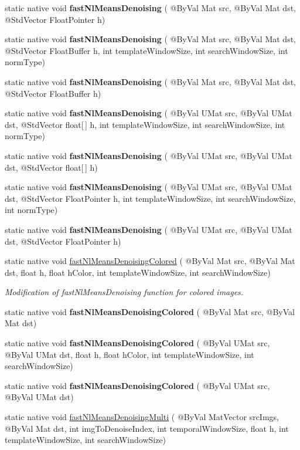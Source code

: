 \begin{DoxyCompactItemize}
static native void {\bfseries fast\+Nl\+Means\+Denoising} ( @By\+Val Mat src, @By\+Val Mat dst, @Std\+Vector Float\+Pointer h)
\item 
static native void {\bfseries fast\+Nl\+Means\+Denoising} ( @By\+Val Mat src, @By\+Val Mat dst, @Std\+Vector Float\+Buffer h, int template\+Window\+Size, int search\+Window\+Size, int norm\+Type)
\item 
static native void {\bfseries fast\+Nl\+Means\+Denoising} ( @By\+Val Mat src, @By\+Val Mat dst, @Std\+Vector Float\+Buffer h)
\item 
static native void {\bfseries fast\+Nl\+Means\+Denoising} ( @By\+Val U\+Mat src, @By\+Val U\+Mat dst, @Std\+Vector float\mbox{[}$\,$\mbox{]} h, int template\+Window\+Size, int search\+Window\+Size, int norm\+Type)
\item 
static native void {\bfseries fast\+Nl\+Means\+Denoising} ( @By\+Val U\+Mat src, @By\+Val U\+Mat dst, @Std\+Vector float\mbox{[}$\,$\mbox{]} h)
\item 
static native void {\bfseries fast\+Nl\+Means\+Denoising} ( @By\+Val U\+Mat src, @By\+Val U\+Mat dst, @Std\+Vector Float\+Pointer h, int template\+Window\+Size, int search\+Window\+Size, int norm\+Type)
\item 
static native void {\bfseries fast\+Nl\+Means\+Denoising} ( @By\+Val U\+Mat src, @By\+Val U\+Mat dst, @Std\+Vector Float\+Pointer h)
\item 
static native void \hyperlink{group__photo__denoise_ga0e990dae474182098fcd723642e78888}{fast\+Nl\+Means\+Denoising\+Colored} ( @By\+Val Mat src, @By\+Val Mat dst, float h, float h\+Color, int template\+Window\+Size, int search\+Window\+Size)
\begin{DoxyCompactList}\small\item\em Modification of fast\+Nl\+Means\+Denoising function for colored images. \end{DoxyCompactList}\item 
static native void {\bfseries fast\+Nl\+Means\+Denoising\+Colored} ( @By\+Val Mat src, @By\+Val Mat dst)
\item 
static native void {\bfseries fast\+Nl\+Means\+Denoising\+Colored} ( @By\+Val U\+Mat src, @By\+Val U\+Mat dst, float h, float h\+Color, int template\+Window\+Size, int search\+Window\+Size)
\item 
static native void {\bfseries fast\+Nl\+Means\+Denoising\+Colored} ( @By\+Val U\+Mat src, @By\+Val U\+Mat dst)
\item 
static native void \hyperlink{group__photo__denoise_gac776302e2aaffca0e057b8715f7faa1d}{fast\+Nl\+Means\+Denoising\+Multi} ( @By\+Val Mat\+Vector src\+Imgs, @By\+Val Mat dst, int img\+To\+Denoise\+Index, int temporal\+Window\+Size, float h, int template\+Window\+Size, int search\+Window\+Size)

\end{DoxyCompactItemize}
